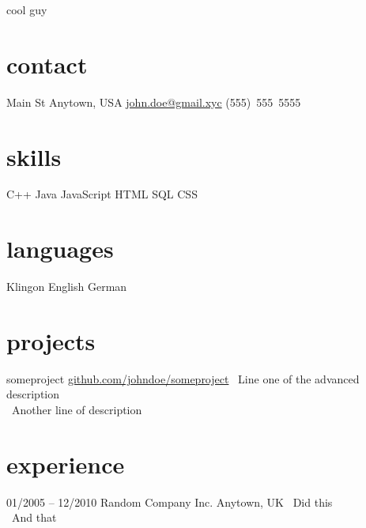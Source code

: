 \documentclass[]{friggeri-minimal-cv}
\begin{document}
       {cool guy}

\begin{aside}
  \section{contact}
     Main St
    Anytown, USA
    \sideblockspace%
    \href{mailto:john.doe@gmail.xyc}{john.doe@gmail.xyc}
    (555)~555~5555
    \sideblockspace%
  \section{skills}
    \quad C++
    \quad Java
    \quad JavaScript
    \quad HTML
    \quad SQL
    \quad CSS
  \section{languages}
    \quad Klingon 
    \quad English
    \quad German
\end{aside}

\section{projects}

\begin{undatedentrylist}
  \undatedentry
    {someproject }
    {\href{https://github.com/johndoe/someproject}{github.com/johndoe/someproject}}
    {\cbullet~Line one of the advanced description\\
     \cbullet~Another line of description}
\end{undatedentrylist}

\section{experience}

\begin{entrylist}
  \monthentry
    {01/2005 -- 12/2010}
    {Random Company Inc. }
    {Anytown, UK}
    {\cbullet~Did this\\
     \cbullet~And that}
\end{entrylist}
\end{document}
